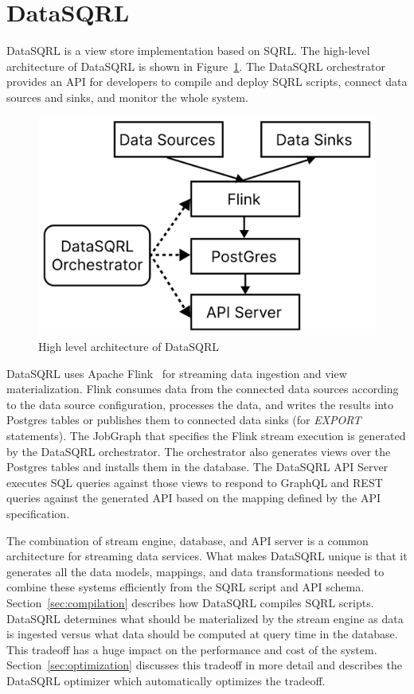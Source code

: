\documentclass[	DIV=calc,%
							paper=letter,%
							fontsize=11pt,%
							twocolumn]{scrartcl}	 					%
\begin{document}
\section{DataSQRL}
\label{sec:datasqrl}

DataSQRL is a view store implementation based on SQRL. The high-level architecture of DataSQRL is shown in Figure~\ref{fig:datasqrl_architecture}. The DataSQRL orchestrator provides an API for developers to compile and deploy SQRL scripts, connect data sources and sinks, and monitor the whole system.

\begin{figure}[h]
\includegraphics[width=\linewidth]{datasqrl_architecture.pdf}
\caption{High level architecture of DataSQRL}
\label{fig:datasqrl_architecture}
\end{figure}

DataSQRL uses Apache Flink~\cite{} for streaming data ingestion and view materialization. Flink consumes data from the connected data sources according to the data source configuration, processes the data, and writes the results into Postgres tables or publishes them to connected data sinks (for \emph{EXPORT} statements). The JobGraph that specifies the Flink stream execution is generated by the DataSQRL orchestrator. The orchestrator also generates views over the Postgres tables and installs them in the database. The DataSQRL API Server executes SQL queries against those views to respond to GraphQL and REST queries against the generated API based on the mapping defined by the API specification.

The combination of stream engine, database, and API server is a common architecture for streaming data services. What makes DataSQRL unique is that it generates all the data models, mappings, and data transformations needed to combine these systems efficiently from the SQRL script and API schema. Section~\ref{sec:compilation} describes how DataSQRL compiles SQRL scripts. DataSQRL determines what should be materialized by the stream engine as data is ingested versus what data should be computed at query time in the database. This tradeoff has a huge impact on the performance and cost of the system. Section~\ref{sec:optimization} discusses this tradeoff in more detail and describes the DataSQRL optimizer which automatically optimizes the tradeoff.
\end{document}
